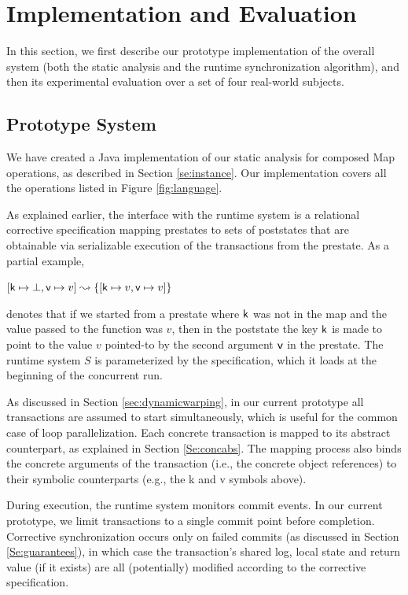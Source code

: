\section{Implementation and Evaluation}\label{Se:experiments}

In this section, we first describe our prototype implementation of the overall system (both the static analysis and the runtime synchronization algorithm), and then its experimental evaluation over a set of four real-world subjects. 

\subsection{Prototype System}
\label{Se:system}

We have created a Java implementation of our static analysis for composed {\sf Map} operations, as described  in Section \ref{se:instance}. Our implementation covers all the operations listed in Figure \ref{fig:language}.

As explained earlier, the interface with the runtime system is a relational corrective specification mapping prestates to sets of poststates that are obtainable via serializable execution of the transactions from the prestate. As a partial example, 
\begin{center}
$[ {\sf k} \mapsto \bot , {\sf v} \mapsto v ] \leadsto \{ [ {\sf k} \mapsto v , {\sf v} \mapsto v ] \}$
\end{center}
denotes that if we started from a prestate where ${\sf k}$ was not in the map and the value passed to the function was $v$, then in the poststate the key ${\sf k}$ is made to point to the value $v$ pointed-to by the second argument ${\sf v}$ in the prestate.
%
The runtime system $S$ is parameterized by the specification, which it loads at the beginning of the concurrent run. 

As discussed in Section \ref{sec:dynamicwarping}, in our current prototype all transactions are assumed to start simultaneously, which is useful for the common case of loop parallelization. Each concrete transaction is mapped to its abstract counterpart, as explained in Section \ref{Se:concabs}. The mapping process also binds the concrete arguments of the transaction (i.e., the concrete object references) to their symbolic counterparts (e.g., the {\sf k} and {\sf v} symbols above). 

During execution, the runtime system monitors commit events. In our current prototype, we limit transactions to a single commit point before completion. Corrective synchronization occurs only on failed commits (as discussed in Section \ref{Se:guarantees}), in which case the transaction's shared log, local state and return value (if it exists) are all (potentially) modified according to the corrective specification. 


